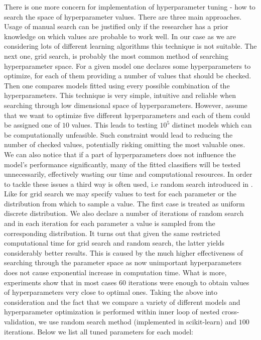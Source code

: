 \documentclass[shortabstract, english, mgr]{iithesis}
\begin{document}
There is one more concern for implementation of hyperparameter tuning - how to search the space of hyperparameter values. There are three main approaches. Usage of manual search can be justified only if the researcher has a prior knowledge on which values are probable to work well. In our case as we are considering lots of different learning algorithms this technique is not suitable. The next one, grid search, is probably the most common method of searching hyperparameter space. For a given model one declares some hyperparameters to optimize, for each of them providing a number of values that should be checked. Then one compares models fitted using every possible combination of the hyperparameters. This technique is very simple, intuitive and reliable when searching through low dimensional space of hyperparameters. However, assume that we want to optimize five different hyperparameters and each of them could be assigned one of $10$ values. This leads to testing $10^5$ distinct models which can be computationally unfeasible. Such constraint would lead to reducing the number of checked values, potentially risking omitting the most valuable ones. We can also notice that if a part of hyperparameters does not influence the model's performance significantly, many of the fitted classifiers will be tested unnecessarily, effectively wasting our time and computational resources. In order to tackle these issues a third way is often used, i.e random search introduced in \cite{randomSearch}. Like for grid search we may specify values to test for each parameter or the distribution from which to sample a value. The first case is treated as uniform discrete distribution. We also declare a number of iterations of random search and in each iteration for each parameter a value is sampled from the corresponding distribution. It turns out that given the same restricted computational time for grid search and random search, the latter yields considerably better results. This is caused by the much higher effectiveness of searching through the parameter space as now unimportant hyperparameters does not cause exponential increase in computation time. What is more, experiments show that in most cases $60$ iterations were enough to obtain values of hyperparameters very close to optimal ones. Taking the above into consideration and the fact that we compare a variety of different models and hyperparameter optimization is performed within inner loop of nested cross-validation, we use random search method (implemented in scikit-learn) and $100$ iterations. Below we list all tuned parameters for each model:
\end{document}
